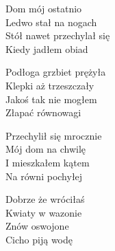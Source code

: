 \begin{text}
    Dom mój ostatnio\\
    Ledwo stał na nogach\\
    Stół nawet przechylał się\\
    Kiedy jadłem obiad

    Podłoga grzbiet prężyła\\
    Klepki aż trzeszczały\\
    Jakoś tak nie mogłem\\
    Złapać równowagi

    Przechylił się mrocznie\\
    Mój dom na chwilę\\
    I mieszkałem kątem\\
    Na równi pochyłej

    Dobrze że wróciłaś\\
    Kwiaty w wazonie\\
    Znów oswojone\\
    Cicho piją wodę
\end{text}
\begin{chord}

\end{chord}